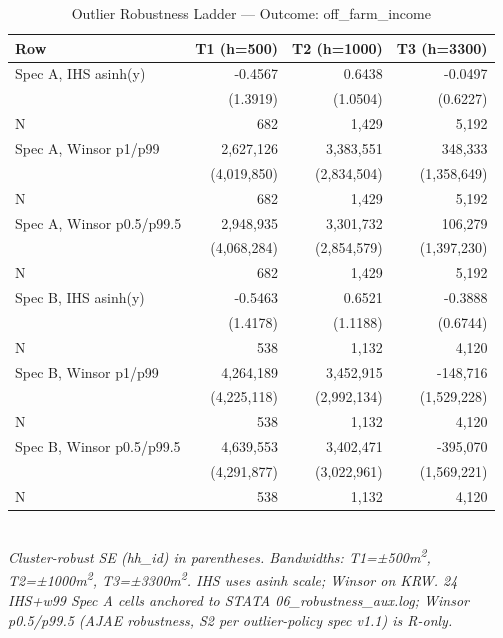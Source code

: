 \begin{table}[t]
\centering
\caption{Outlier Robustness Ladder --- Outcome: off\_farm\_income}
\label{tab:rob_outlier_off_farm_income_en}
\begin{tabular}{lrrr}
\toprule
Row & T1 (h=500) & T2 (h=1000) & T3 (h=3300) \\
\midrule
Spec A, IHS asinh(y) & -0.4567 & 0.6438 & -0.0497 \\
        & (1.3919) & (1.0504) & (0.6227) \\
N       & 682 & 1,429 & 5,192 \\
Spec A, Winsor p1/p99 & 2,627,126 & 3,383,551 & 348,333 \\
        & (4,019,850) & (2,834,504) & (1,358,649) \\
N       & 682 & 1,429 & 5,192 \\
Spec A, Winsor p0.5/p99.5 & 2,948,935 & 3,301,732 & 106,279 \\
        & (4,068,284) & (2,854,579) & (1,397,230) \\
N       & 682 & 1,429 & 5,192 \\
Spec B, IHS asinh(y) & -0.5463 & 0.6521 & -0.3888 \\
        & (1.4178) & (1.1188) & (0.6744) \\
N       & 538 & 1,132 & 4,120 \\
Spec B, Winsor p1/p99 & 4,264,189 & 3,452,915 & -148,716 \\
        & (4,225,118) & (2,992,134) & (1,529,228) \\
N       & 538 & 1,132 & 4,120 \\
Spec B, Winsor p0.5/p99.5 & 4,639,553 & 3,402,471 & -395,070 \\
        & (4,291,877) & (3,022,961) & (1,569,221) \\
N       & 538 & 1,132 & 4,120 \\
\bottomrule
\end{tabular}
\\
\footnotesize\textit{Cluster-robust SE (hh\_id) in parentheses. Bandwidths: T1=±500m\textsuperscript{2}, T2=±1000m\textsuperscript{2}, T3=±3300m\textsuperscript{2}. IHS uses asinh scale; Winsor on KRW. 24 IHS+w99 Spec A cells anchored to STATA 06\_robustness\_aux.log; Winsor p0.5/p99.5 (AJAE robustness, S2 per outlier-policy spec v1.1) is R-only.}
\end{table}


